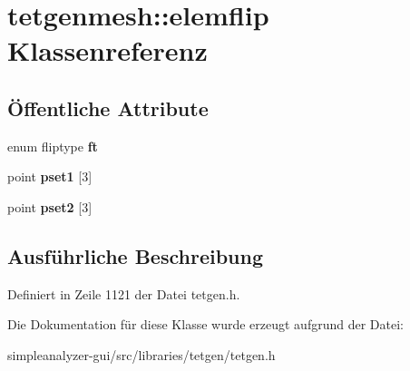 \hypertarget{classtetgenmesh_1_1elemflip}{\section{tetgenmesh\-:\-:elemflip Klassenreferenz}
\label{classtetgenmesh_1_1elemflip}
}
\subsection*{Öffentliche Attribute}
\begin{DoxyCompactItemize}
\item 
\hypertarget{classtetgenmesh_1_1elemflip_a7cff4e7c29485ca9d5348b62ce1cc5f5}{enum fliptype {\bfseries ft}}\label{classtetgenmesh_1_1elemflip_a7cff4e7c29485ca9d5348b62ce1cc5f5}

\item 
\hypertarget{classtetgenmesh_1_1elemflip_a395c999eeefa8daa89fa0a57551aeddb}{point {\bfseries pset1} \mbox{[}3\mbox{]}}\label{classtetgenmesh_1_1elemflip_a395c999eeefa8daa89fa0a57551aeddb}

\item 
\hypertarget{classtetgenmesh_1_1elemflip_aa77e84807d092afee8fa7eacc91407b7}{point {\bfseries pset2} \mbox{[}3\mbox{]}}\label{classtetgenmesh_1_1elemflip_aa77e84807d092afee8fa7eacc91407b7}

\end{DoxyCompactItemize}


\subsection{Ausführliche Beschreibung}


Definiert in Zeile 1121 der Datei tetgen.\-h.



Die Dokumentation für diese Klasse wurde erzeugt aufgrund der Datei\-:\begin{DoxyCompactItemize}
\item 
simpleanalyzer-\/gui/src/libraries/tetgen/tetgen.\-h\end{DoxyCompactItemize}
